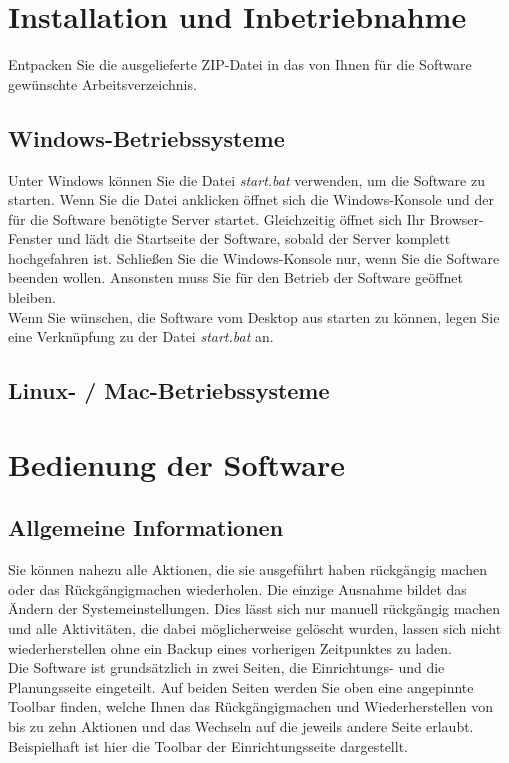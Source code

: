 \documentclass[fontsize=12pt]{scrartcl}
\begin{document}
\section{Installation und Inbetriebnahme}

Entpacken Sie die ausgelieferte ZIP-Datei in das von Ihnen für die Software gewünschte Arbeitsverzeichnis. 

\subsection{Windows-Betriebssysteme}
Unter Windows können Sie die Datei \textit{start.bat} verwenden, um die Software zu starten. Wenn Sie die Datei anklicken öffnet sich die Windows-Konsole und der für die Software benötigte Server startet. Gleichzeitig öffnet sich Ihr Browser-Fenster und lädt die Startseite der Software, sobald der Server komplett hochgefahren ist. Schließen Sie die Windows-Konsole nur, wenn Sie die Software beenden wollen. Ansonsten muss Sie für den Betrieb der Software geöffnet bleiben.\\
Wenn Sie wünschen, die Software vom Desktop aus starten zu können, legen Sie eine Verknüpfung zu der Datei \textit{start.bat} an.

\subsection{Linux- / Mac-Betriebssysteme}

\section{Bedienung der Software}

\subsection{Allgemeine Informationen}

Sie können nahezu alle Aktionen, die sie ausgeführt haben rückgängig machen oder das Rückgängigmachen wiederholen. Die einzige Ausnahme bildet das Ändern der Systemeinstellungen. Dies lässt sich nur manuell rückgängig machen und alle Aktivitäten, die dabei möglicherweise gelöscht wurden, lassen sich nicht wiederherstellen ohne ein Backup eines vorherigen Zeitpunktes zu laden.\\

Die Software ist grundsätzlich in zwei Seiten, die Einrichtungs- und die Planungsseite eingeteilt. Auf beiden Seiten werden Sie oben eine angepinnte Toolbar finden, welche Ihnen das Rückgängigmachen und Wiederherstellen von bis zu zehn Aktionen und das Wechseln auf die jeweils andere Seite erlaubt. Beispielhaft ist hier die Toolbar der Einrichtungsseite dargestellt.
\end{document}
